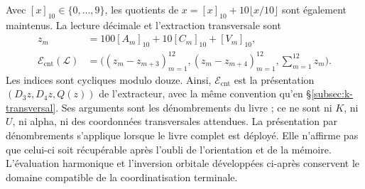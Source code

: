 Avec \([x]_{10}\in\{0,\ldots,9\}\), les quotients de \(x=[x]_{10}+10\lfloor x/10\rfloor\) sont également maintenus. La lecture décimale et l'extraction transversale sont
\[
\begin{aligned}
 z_m&=100[A_m]_{10}+10[C_m]_{10}+[V_m]_{10},\\
 \mathcal E_{\mathrm{cnt}}(\mathscr L)
   &=\bigl((z_m-z_{m+3})_{m=1}^{12},
           (z_m-z_{m+4})_{m=1}^{12},\sum_{m=1}^{12}z_m\bigr).
\end{aligned}
\]
Les indices sont cycliques modulo douze. Ainsi, \(\mathcal E_{\mathrm{cnt}}\)
est la présentation \((D_3z,D_4z,Q(z))\) de l'extracteur, avec la même
convention qu'en \S\ref{subsec:k-transversal}. Ses arguments sont les
dénombrements du livre ; ce ne sont ni \(K\), ni \(U\), ni alpha, ni des coordonnées transversales
attendues. La présentation par dénombrements s'applique lorsque le
livre complet est déployé. Elle n'affirme pas que celui-ci soit récupérable après l'oubli
de l'orientation et de la mémoire. L'évaluation harmonique et l'inversion orbitale
développées ci-après conservent le domaine compatible de la
coordinatisation terminale.

